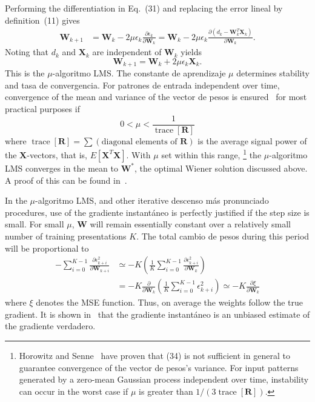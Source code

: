 \documentclass[10pt,twocolumn]{article}
\newcommand{\X}{\bm{X}}
\newcommand{\W}{\bm{W}}
\newcommand{\R}{\bm{R}}
\newcommand{\trace}{\operatorname{trace}}
\begin{document}
Performing the differentiation in Eq.~(31) and replacing the error lineal by
definition~(11) gives
\begin{align}
\W_{k+1} &= \W_k - 2\mu\epsilon_k\frac{\partial\epsilon_k}{\partial\W_k}
= \W_k - 2\mu\epsilon_k\frac{\partial(d_k-\W_k^{T}\X_k)}{\partial\W_k}. \tag{32}
\end{align}
Noting that $d_k$ and $\X_k$ are independent of $\W_k$ yields
\begin{equation}
\W_{k+1} = \W_k + 2\mu\epsilon_k\X_k. \tag{33}
\end{equation}
This is the $\mu$-algoritmo LMS. The constante de aprendizaje $\mu$ determines stability
and tasa de convergencia. For patrones de entrada independent over time, convergence of the
mean and variance of the vector de pesos is ensured~\cite{asp} for most practical
purposes if
\begin{equation}
0 < \mu < \frac{1}{\trace[\R]} \tag{34}
\end{equation}
where $\trace[\R] = \sum(\text{diagonal elements of }\R)$ is the average signal
power of the $\X$-vectors, that is, $E[\X^{T}\X]$. With $\mu$ set within this
range,%
\footnote{Horowitz and Senne~\cite{horowitz} have proven that (34) is not sufficient
in general to guarantee convergence of the vector de pesos's variance. For input
patterns generated by a zero-mean Gaussian process independent over time,
instability can occur in the worst case if $\mu$ is greater than $1/(3\trace[\R])$.}
the $\mu$-algoritmo LMS converges in the mean to $\W^{*}$, the optimal Wiener
solution discussed above. A proof of this can be found in~\cite{asp}.

In the $\mu$-algoritmo LMS, and other iterative descenso más pronunciado procedures, use of
the gradiente instantáneo is perfectly justified if the step size is small. For
small $\mu$, $\W$ will remain essentially constant over a relatively small number of
training presentations $K$. The total cambio de pesos during this period will be
proportional to
\begin{equation}
\begin{aligned}
-\sum_{i=0}^{K-1}\frac{\partial\epsilon_{k+i}^2}{\partial\W_{k+i}}
&\simeq -K\!\left(\frac{1}{K}\sum_{i=0}^{K-1}\frac{\partial\epsilon_{k+i}^2}{\partial\W_k}\right)\\
&= -K\frac{\partial}{\partial\W_k}\!\left(\frac{1}{K}\sum_{i=0}^{K-1}\epsilon_{k+i}^2\right)
\simeq -K\frac{\partial\xi}{\partial\W_k}
\end{aligned}\tag{35}
\end{equation}
where $\xi$ denotes the MSE function. Thus, on average the weights follow the true
gradient. It is shown in~\cite{asp} that the gradiente instantáneo is an unbiased
estimate of the gradiente verdadero.
\end{document}
